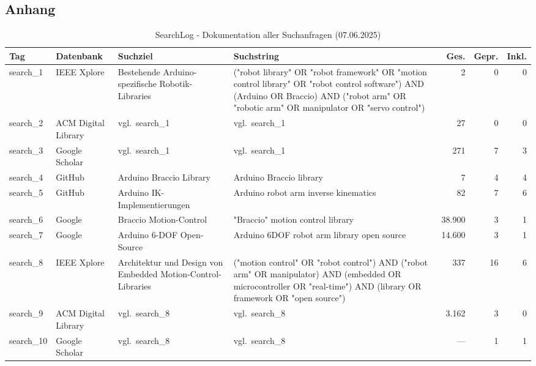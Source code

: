 \documentclass[12pt,a4paper]{article}
\begin{document}

\newpage
\printbibliography[heading=bibintoc]

\begin{landscape}
\pagestyle{empty}
\section*{Anhang}

\begin{table}[H]
\centering
\caption{SearchLog - Dokumentation aller Suchanfragen (07.06.2025)}
\label{tab:searchlog}
\small
\begin{tabularx}{0.95\linewidth}{l l p{3cm} p{7.5cm} r r r}
\toprule
\textbf{Tag} & \textbf{Datenbank} & \textbf{Suchziel} & \textbf{Suchstring} & \textbf{Ges.} & \textbf{Gepr.} & \textbf{Inkl.} \\
\midrule
search\_1 & IEEE Xplore & Bestehende Arduino-spezifische Robotik-Libraries &
  ("robot library" OR "robot framework" OR "motion control library" OR "robot control software") AND (Arduino OR Braccio) AND ("robot arm" OR "robotic arm" OR manipulator OR "servo control")
  & 2 & 0 & 0 \\
\addlinespace
search\_2 & ACM Digital Library & vgl.\ search\_1 & vgl.\ search\_1 & 27 & 0 & 0 \\
\addlinespace
search\_3 & Google Scholar & vgl.\ search\_1 & vgl.\ search\_1 & 271 & 7 & 3 \\
\addlinespace
search\_4 & GitHub & Arduino Braccio Library &
  Arduino Braccio library & 7 & 4 & 4 \\
\addlinespace
search\_5 & GitHub & Arduino IK-Implementierungen &
  Arduino robot arm inverse kinematics & 82 & 7 & 6 \\
\addlinespace
search\_6 & Google & Braccio Motion-Control &
  "Braccio" motion control library & 38.900 & 3 & 1 \\
\addlinespace
search\_7 & Google & Arduino 6-DOF Open-Source &
  Arduino 6DOF robot arm library open source & 14.600 & 3 & 1 \\
\addlinespace
search\_8 & IEEE Xplore & Architektur und Design von Embedded Motion-Control-Libraries &
  ("motion control" OR "robot control") AND ("robot arm" OR manipulator) AND (embedded OR microcontroller OR "real-time") AND (library OR framework OR "open source")
  & 337 & 16 & 6 \\
\addlinespace
search\_9 & ACM Digital Library & vgl.\ search\_8 & vgl.\ search\_8 & 3.162 & 3 & 0 \\
\addlinespace
search\_10 & Google Scholar & vgl.\ search\_8 & vgl.\ search\_8 & {—} & 1 & 1 \\
\bottomrule
\end{tabularx}
\end{table}


\end{landscape}
\end{document}

